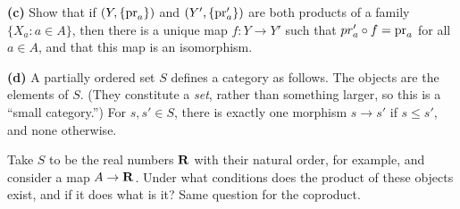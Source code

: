 \documentclass[12pt]{article}
\begin{document}
{\bf (c)} Show that if $(Y,\{\mathrm{pr}_a\})$ and $(Y',\{\mathrm{pr}'_a\})$ are both products
of a family $\{X_a:a\in A\}$, then there is a unique map $f:Y\to Y'$ such that
$pr'_a\circ f=\mathrm{pr}_a$ for all $a\in A$, and that this map is an isomorphism. 

{\bf(d)} 
A partially ordered set $S$ defines a category as follows. The objects
are the elements of $S$. (They constitute a {\em set}, rather than 
something larger, so this is a ``small category.'') For $s,s'\in S$,
there is exactly one morphism $s\to s'$ if $s\leq s'$, and none otherwise.

Take $S$ to be the real numbers $\mathbf R$ with their natural order, 
for example, and consider a map $A\to\mathbf R$. Under what conditions does the 
product of these objects exist, and if it does what is it? Same question
for the coproduct. 
\end{document}
